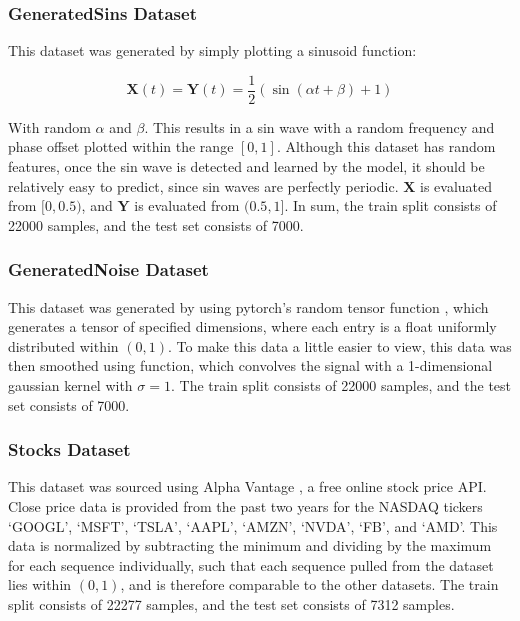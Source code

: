 \documentclass{scrartcl}
\begin{document}
\subsubsection{GeneratedSins Dataset}
\label{subsubsec:generatedsins_intro}

This dataset was generated by simply plotting a sinusoid function:

\begin{equation}
	\boldsymbol{X} (t) = \boldsymbol{Y} (t) = \frac{1}{2} ( \sin (\alpha t + \beta) + 1)
	\label{eq:generated_sins}
\end{equation}

With random $\alpha$ and $\beta$. This results in a sin wave with a random
frequency and phase offset plotted within the range $[0, 1]$. Although this
dataset has random features, once the sin wave is detected and learned by the
model, it should be relatively easy to predict, since sin waves are perfectly
periodic. $\boldsymbol{X}$ is evaluated from $[0, 0.5)$, and $\boldsymbol{Y}$
is evaluated from $(0.5, 1]$. In sum, the train split consists of 22000
samples, and the test set consists of 7000. 

\subsubsection{GeneratedNoise Dataset}
\label{subsubsec:generatednoise_intro}

This dataset was generated by using pytorch's random tensor function
, which generates a tensor of specified dimensions,
where each entry is a float uniformly distributed within $(0, 1)$. To make this
data a little easier to view, this data was then smoothed using
 function, which convolves
the signal with a 1-dimensional gaussian kernel with $\sigma = 1$. The train
split consists of 22000 samples, and the test set consists of 7000.

\subsubsection{Stocks Dataset}
\label{subsubsec:stocks_intro}

This dataset was sourced using Alpha Vantage \cite{alpha_vantage}, a free
online stock price API. Close price data is provided from the past two years
for the NASDAQ tickers `GOOGL', `MSFT', `TSLA', `AAPL', `AMZN', `NVDA', `FB',
and `AMD'. This data is normalized by subtracting the minimum and dividing by
the maximum for each sequence individually, such that each sequence pulled from
the dataset lies within $(0, 1)$, and is therefore comparable to the other
datasets. The train split consists of 22277 samples, and the test set consists
of 7312 samples.
\end{document}
